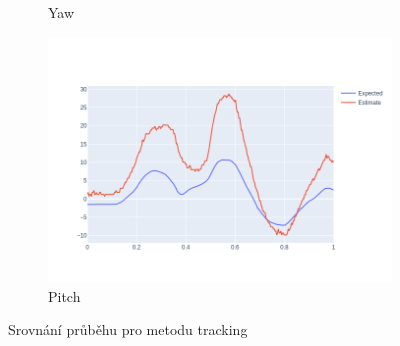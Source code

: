 \documentclass[12pt,a4paper,titlepage,final]{report}
\begin{document}
\begin{figure}[!h]
\begin{subfigure}[b]{0.32\textwidth}
   \caption{Yaw}
    \label{fig:track_yaw}
  \end{subfigure}
  \hfill
    \begin{subfigure}[b]{0.32\textwidth}
    \includegraphics[width=\textwidth]{images/evaluation/tracking_pitch_user_01_video_07.png}
   \caption{Pitch}
    \label{fig:track_pitch}
  \end{subfigure}
  \caption{Srovnání průběhu pro metodu tracking}
  \label{fig:track_graphs}
\end{figure}
\end{document}
